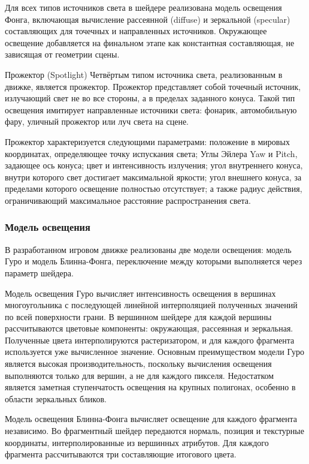 Для всех типов источников света в шейдере реализована модель освещения Фонга, включающая вычисление рассеянной (diffuse) и зеркальной (specular) составляющих для точечных и направленных источников. Окружающее освещение добавляется на финальном этапе как константная составляющая, не зависящая от геометрии сцены.

Прожектор (Spotlight) Четвёртым типом источника света, реализованным в движке, является прожектор. Прожектор представляет собой точечный источник, излучающий свет не во все стороны, а в пределах заданного конуса. Такой тип освещения имитирует направленные источники света: фонарик, автомобильную фару, уличный прожектор или луч света на сцене.

Прожектор характеризуется следующими параметрами: положение в мировых координатах, определяющее точку испускания света; Углы Эйлера Yaw и Pitch, задающее ось конуса; цвет и интенсивность излучения; угол внутреннего конуса, внутри которого свет достигает максимальной яркости; угол внешнего конуса, за пределами которого освещение полностью отсутствует; а также радиус действия, ограничивающий максимальное расстояние распространения света.

\subsubsection{Модель освещения}
В разработанном игровом движке реализованы две модели освещения: модель Гуро и модель Блинна-Фонга, переключение между которыми выполняется через параметр шейдера.

Модель освещения Гуро вычисляет интенсивность освещения в вершинах многоугольника с последующей линейной интерполяцией полученных значений по всей поверхности грани. В вершинном шейдере для каждой вершины рассчитываются цветовые компоненты: окружающая, рассеянная и зеркальная. Полученные цвета интерполируются растеризатором, и для каждого фрагмента используется уже вычисленное значение. Основным преимуществом модели Гуро является высокая производительность, поскольку вычисления освещения выполняются только для вершин, а не для каждого пикселя. Недостатком является заметная ступенчатость освещения на крупных полигонах, особенно в области зеркальных бликов.

Модель освещения Блинна-Фонга вычисляет освещение для каждого фрагмента независимо. Во фрагментный шейдер передаются нормаль, позиция и текстурные координаты, интерполированные из вершинных атрибутов. Для каждого фрагмента рассчитываются три составляющие итогового цвета.

